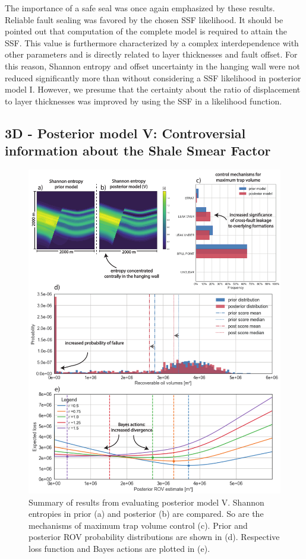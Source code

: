 		The importance of a safe seal was once again emphasized by these results. Reliable fault sealing was favored by the chosen SSF likelihood. It should be pointed out that computation of the complete model is required to attain the SSF. This value is furthermore characterized by a complex interdependence with other parameters and is directly related to layer thicknesses and fault offset. For this reason, Shannon entropy and offset uncertainty in the hanging wall were not reduced significantly more than without considering a SSF likelihood in posterior model I. However, we presume that the certainty about the ratio of displacement to layer thicknesses was improved by using the SSF in a likelihood function.
		
		\subsection{3D - Posterior model V: Controversial information about the Shale Smear Factor}\label{sec:model5}%
		\begin{figure}[p!]
			\centering
			\includegraphics[width=1\textwidth]{Figures/ML5}
			\caption{Summary of results from evaluating posterior model V. Shannon entropies in prior (a) and posterior (b) are compared. So are the mechanisms of maximum trap volume control (c). Prior and posterior ROV probability distributions are shown in (d). Respective loss function and Bayes actions are plotted in (e).}\label{fig:ML5}
		\end{figure}
